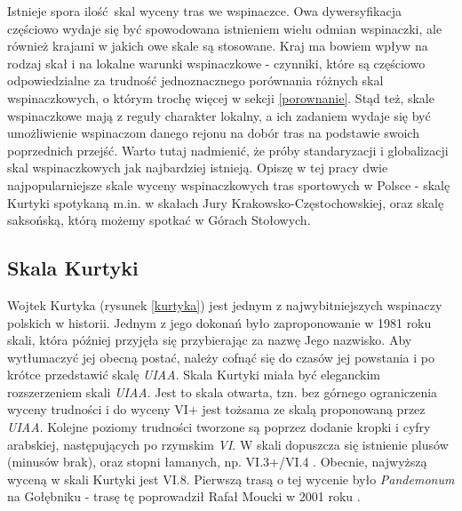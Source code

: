 \documentclass{article}
\begin{document}
Istnieje spora ilość skal wyceny tras we wspinaczce. Owa dywersyfikacja częściowo wydaje się być spowodowana istnieniem wielu odmian wspinaczki, ale również krajami w jakich owe skale są stosowane. Kraj ma bowiem wpływ na rodzaj skał i na lokalne warunki wspinaczkowe - czynniki, które są częściowo odpowiedzialne za trudność jednoznacznego porównania różnych skal wspinaczkowych, o którym trochę więcej w sekcji \ref{porownanie}. Stąd też, skale wspinaczkowe mają z reguły charakter lokalny, a ich zadaniem wydaje się być umożliwienie wspinaczom danego rejonu na dobór tras na podstawie swoich poprzednich przejść. Warto tutaj nadmienić, że próby standaryzacji i globalizacji skal wspinaczkowych jak najbardziej istnieją. Opiszę w tej pracy dwie najpopularniejsze skale wyceny wspinaczkowych tras sportowych w Polsce - skalę Kurtyki spotykaną m.in. w skałach Jury Krakowsko-Częstochowskiej, oraz skalę saksońską, którą możemy spotkać w Górach Stołowych.

\subsection{Skala Kurtyki}
Wojtek Kurtyka (rysunek \ref{kurtyka}) jest jednym z najwybitniejszych wspinaczy polskich w historii. Jednym z jego dokonań było zaproponowanie w 1981 roku skali, która później przyjęła się przybierając za nazwę Jego nazwisko. Aby wytłumaczyć jej obecną postać, należy cofnąć się do czasów jej powstania i po krótce przedstawić skalę \textit{UIAA}. Skala Kurtyki miała być eleganckim rozszerzeniem skali \textit{UIAA}. Jest to skala otwarta, tzn. bez górnego ograniczenia wyceny trudności i do wyceny VI+ jest tożsama ze skalą proponowaną przez \textit{UIAA}. Kolejne poziomy trudności tworzone są poprzez dodanie kropki i cyfry arabskiej, następujących po rzymskim \textit{VI}. W skali dopuszcza się istnienie plusów (minusów brak), oraz stopni łamanych, np. VI.3+/VI.4 \cite{drytooling-skale}. Obecnie, najwyższą wyceną w skali Kurtyki jest VI.8. Pierwszą trasą o tej wycenie było \textit{Pandemonum} na Gołębniku - trasę tę poprowadził Rafał Moucki w 2001 roku \cite{VI8}.
\end{document}
